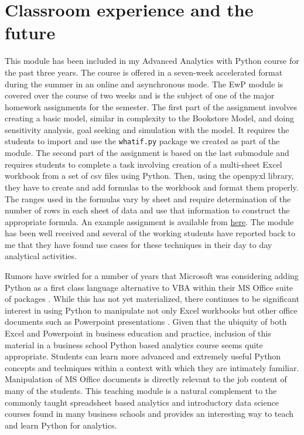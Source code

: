 \documentclass[ited,blindrev]{informs3}              %
\newcommand{\code}[1]{\texttt{#1}}
\begin{document}
\section{Classroom experience and the future}

This module has been included in my Advanced Analytics with Python course for the past three years. The course is offered in a seven-week accelerated format during the summer in an online and asynchronous mode. The EwP module is covered over the course of two weeks and is the subject of one of the major homework assignments for the semester. The first part of the assignment involves creating a basic model, similar in complexity to the Bookstore Model, and doing sensitivity analysis, goal seeking and simulation with the model. It requires the students to import and use the \code{whatif.py} package we created as part of the module. The second part of the assignment is based on the last submodule and requires  students to complete a task involving creation of a multi-sheet Excel workbook from a set of csv files using Python. Then, using the openpyxl library, they have to create and add formulas to the workbook and format them properly. The ranges used in the formulas vary by sheet and require determination of the number of rows in each sheet of data and use that information to construct the appropriate formula. An example assignment is available from \href{some.url}{here}. The module has been well received and several of the working students have reported back to me that they have found use cases for these techniques in their day to day analytical activities.


Rumors have swirled for a number of years that Microsoft was considering adding Python as a first class language alternative to VBA within their MS Office suite of packages \cite{MicrosoftConsidersAdding}. While this has not yet materialized, there continues to be significant interest in using Python to manipulate not only Excel workbooks but other office documents such as Powerpoint presentations \cite{PythonpptxPythonpptx21}. Given that the ubiquity of both Excel and Powerpoint in business education and practice, inclusion of this material in a business school Python based analytics course seems quite appropriate. Students can learn more advanced and extremely useful Python concepts and techniques within a context with which they are intimately familiar. Manipulation of MS Office documents is directly relevant to the job content of many of the students. This teaching module is a natural complement to the commonly taught spreadsheet based analytics and introductory data science courses found in many business schools and provides an interesting way to teach and learn Python for analytics.
\end{document}
